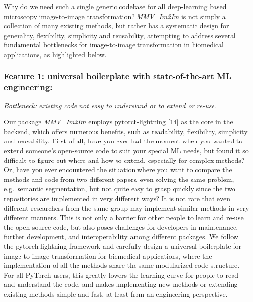Why do we need such a single generic codebase for all deep-learning based microscopy image-to-image transformation? \emph{MMV\_Im2Im} is not simply a collection of many existing methods, but rather has a systematic design for generality, flexibility, simplicity and reusability, attempting to address several fundamental bottlenecks for image-to-image transformation in biomedical applications, as highlighted below.

\hypertarget{feature-1-universal-boilerplate-with-state-of-the-art-ml-engineering}{%
\subsubsection{Feature 1: universal boilerplate with state-of-the-art ML engineering:}\label{feature-1-universal-boilerplate-with-state-of-the-art-ml-engineering}}

\emph{Bottleneck: existing code not easy to understand or to extend or re-use}.

Our package \emph{MMV\_Im2Im} employs pytorch-lightning {[}\protect\hyperlink{ref-YbvSvdyB}{14}{]} as the core in the backend, which offers numerous benefits, such as readability, flexibility, simplicity and reusability. First of all, have you ever had the moment when you wanted to extend someone's open-source code to suit your special ML needs, but found it so difficult to figure out where and how to extend, especially for complex methods? Or, have you ever encountered the situation where you want to compare the methods and code from two different papers, even solving the same problem, e.g.~semantic segmentation, but not quite easy to grasp quickly since the two repositories are implemented in very different ways? It is not rare that even different researchers from the same group may implement similar methods in very different manners. This is not only a barrier for other people to learn and re-use the open-source code, but also poses challenges for developers in maintenance, further development, and interoperability among different packages. We follow the pytorch-lightning framework and carefully design a universal boilerplate for image-to-image transformation for biomedical applications, where the implementation of all the methods share the same modularized code structure. For all PyTorch users, this greatly lowers the learning curve for people to read and understand the code, and makes implementing new methods or extending existing methods simple and fast, at least from an engineering perspective.

